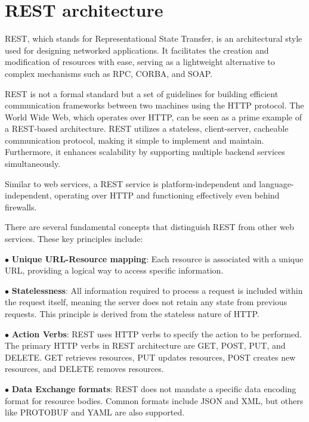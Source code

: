 \section{REST architecture}
REST, which stands for Representational State Transfer, is an architectural style used for designing networked applications. It facilitates the creation and modification of resources with ease, serving as a lightweight alternative to complex mechanisms such as RPC, CORBA, and SOAP.

REST is not a formal standard but a set of guidelines for building efficient communication frameworks between two machines using the HTTP protocol. The World Wide Web, which operates over HTTP, can be seen as a prime example of a REST-based architecture. REST utilizes a stateless, client-server, cacheable communication protocol, making it simple to implement and maintain. Furthermore, it enhances scalability by supporting multiple backend services simultaneously.

Similar to web services, a REST service is platform-independent and language-independent, operating over HTTP and functioning effectively even behind firewalls.

There are several fundamental concepts that distinguish REST from other web services. These key principles include:

$\bullet$ \textbf{Unique URL-Resource mapping}: Each resource is associated with a unique URL, providing a logical way to access specific information. 

$\bullet$ \textbf{Statelessness}: All information required to process a request is included within the request itself, meaning the server does not retain any state from previous requests. This principle is derived from the stateless nature of HTTP.

$\bullet$ \textbf{Action Verbs}: REST uses HTTP verbs to specify the action to be performed. The primary HTTP verbs in REST architecture are GET, POST, PUT, and DELETE. GET retrieves resources, PUT updates resources, POST creates new resources, and DELETE removes resources.

$\bullet$ \textbf{Data Exchange formats}: REST does not mandate a specific data encoding format for resource bodies. Common formats include JSON \cite{json} and XML, but others like PROTOBUF and YAML are also supported.



